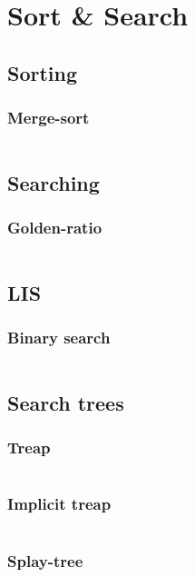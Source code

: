 \section{Sort \& Search}

\subsection{Sorting}
\subsubsection{Merge-sort}
\inputminted{cpp}{../code/sort/merge_sort.cpp}


\subsection{Searching}
\subsubsection{Golden-ratio}
\inputminted{cpp}{../code/sort/golden_ratio.cpp}

\subsection{LIS}
\subsubsection{Binary search}
\inputminted{cpp}{../code/sort/LIS/binary_search.cpp}

\subsection{Search trees}
\subsubsection{Treap}
\inputminted{cpp}{../code/sort/tree/treap.cpp}
\subsubsection{Implicit treap}
\inputminted{cpp}{../code/sort/tree/implicit.cpp}
\subsubsection{Splay-tree}
\inputminted{cpp}{../code/sort/tree/splay.cpp}